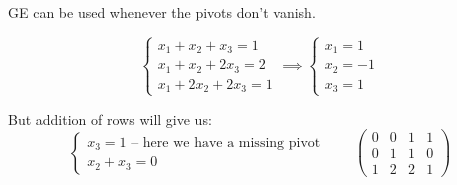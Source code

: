 GE can be used whenever the pivots don't vanish.
\begin{example}
    \[
    \begin{cases}
        x_1 + x_2 + x_3 = 1\\
        x_1 + x_2 + 2x_3 = 2\\
        x_1 + 2x_2 + 2x_3 = 1
    \end{cases} \implies
    \begin{cases}
        x_1 = 1\\ x_2 = -1 \\ x_3 = 1
    \end{cases}
\]

But addition of rows will give us:
\[
    \begin{cases}
        x_3 = 1 \text{ -- here we have a missing pivot}\\
        x_2 + x_3 = 0
    \end{cases}
    \qquad
    \left(\begin{array}{ccc|c}
        0 & 0 & 1 & 1\\
        0 & 1 & 1 & 0\\
        1 & 2 & 2 & 1
    \end{array}
    \right)
\]
\end{example}

